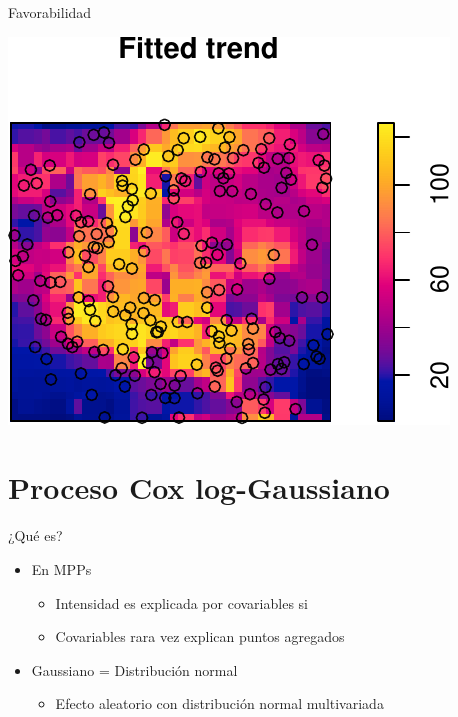 \documentclass[
  11pt,
  ignorenonframetext,
]{beamer}
\providecommand{\tightlist}{%
  \setlength{\itemsep}{0pt}\setlength{\parskip}{0pt}}
\begin{document}
\begin{frame}{Favorabilidad}
\protect\hypertarget{favorabilidad}{}
\begin{center}\includegraphics{Tutorial-spatstat-2_files/figure-beamer/unnamed-chunk-34-1} \end{center}
\end{frame}

\hypertarget{proceso-cox-log-gaussiano}{%
\section{Proceso Cox log-Gaussiano}\label{proceso-cox-log-gaussiano}}

\begin{frame}{¿Qué es?}
\protect\hypertarget{quuxe9-es}{}
\begin{itemize}
\item
  En MPPs

  \begin{itemize}
  \tightlist
  \item
    Intensidad es explicada por covariables si
  \item
    Covariables rara vez explican puntos agregados
  \end{itemize}
\item
  Gaussiano = Distribución normal

  \begin{itemize}
  \tightlist
  \item
    Efecto aleatorio con distribución normal multivariada
  \end{itemize}
\end{itemize}
\end{frame}
\end{document}
